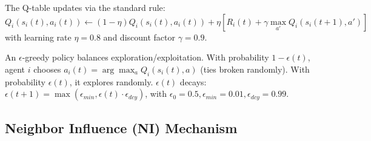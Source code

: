 \documentclass[preprint,number,sort&compress,12pt]{elsarticle}
\begin{document}
The Q-table updates via the standard rule:
\begin{equation}
Q_i(s_i(t), a_i(t)) \leftarrow (1 - \eta) Q_i(s_i(t), a_i(t)) + \eta \left[ R_i(t) + \gamma \max_{a'} Q_i(s_i(t+1), a') \right]
\label{eq:q_update_model_restored}
\end{equation}
with learning rate $\eta=0.8$ and discount factor $\gamma=0.9$.

An $\epsilon$-greedy policy balances exploration/exploitation. With probability $1 - \epsilon(t)$, agent $i$ chooses $a_i(t) = \arg \max_{a} Q_i(s_i(t), a)$ (ties broken randomly). With probability $\epsilon(t)$, it explores randomly. $\epsilon(t)$ decays: $\epsilon(t+1) = \max(\epsilon_{min}, \epsilon(t) \cdot \epsilon_{dcy})$, with $\epsilon_0 = 0.5, \epsilon_{min} = 0.01, \epsilon_{dcy} = 0.99$.

\subsection{Neighbor Influence (NI) Mechanism}
\end{document}
